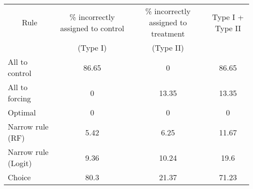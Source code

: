 \begin{tabular}{lccc}
\toprule
\multicolumn{1}{c}{Rule} & \% incorrectly assigned to control  & \% incorrectly assigned to treatment & Type I + Type II \\
      & (Type I) & (Type II) &  \\
\midrule
\midrule
All to control & 86.65 & 0     & 86.65 \\
All to forcing & 0     & 13.35 & 13.35 \\
Optimal & 0     & 0     & 0 \\
Narrow rule (RF) & 5.42  & 6.25  & 11.67 \\
Narrow rule (Logit) & 9.36  & 10.24 & 19.6 \\
Choice & 80.3  & 21.37 & 71.23 \\
\bottomrule
\bottomrule
\end{tabular}%
